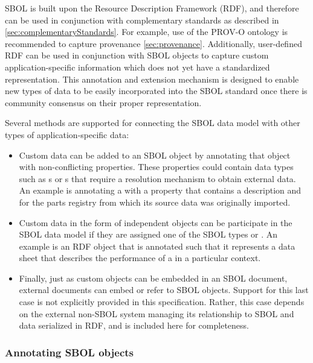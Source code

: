 SBOL is built upon the Resource Description Framework (RDF), and therefore can be used in conjunction with complementary standards as described in \autoref{sec:complementaryStandards}.  For example, use of the PROV-O ontology is recommended to capture provenance \autoref{sec:provenance}.  Additionally, user-defined RDF can be used in conjunction with SBOL objects to capture custom application-specific information which does not yet have a standardized representation.  This annotation and extension mechanism is designed to enable new types of data to be easily incorporated into the SBOL standard once there is community consensus on their proper representation.

Several methods are supported for connecting the SBOL data model with other types of application-specific data:

\begin{itemize}
\item Custom data can be added to an SBOL object by annotating that object with non-conflicting properties. These properties could contain  data types such as s or s that require a resolution mechanism to obtain external data. An example is annotating a  with  a property that contains a  description and  for the parts registry from which its source data was originally imported.
\item Custom data in the form of independent objects can be participate in the SBOL data model if they are assigned one of the SBOL types  or .  An example is an RDF object that is annotated such that it represents a data sheet that describes the performance of a  in a particular context.
\item Finally, just as custom objects can be embedded in an  SBOL document, external documents can embed or refer to SBOL objects. Support for this last case is not explicitly provided in this specification. Rather, this case depends on the external non-SBOL system managing its relationship to SBOL and data serialized in RDF, and is included here for completeness.
\end{itemize}

\subsubsection{Annotating SBOL objects}
\label{sec:qName}
\label{sec:QName}
\label{sec:value}
\label{sec:Annotation}
\label{sec:AnnotationValue}
\label{sec:NestedAnnotations}
\label{sec:nestedQName}
\label{sec:nestedURI}

